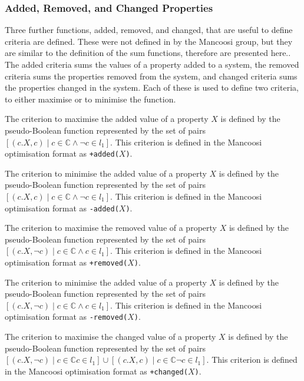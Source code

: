 \subsubsection{Added, Removed, and Changed Properties}
Three further functions, added, removed, and changed, that are useful to define criteria are defined.
These were not defined in by the Mancoosi group, but they are similar to the definition of the sum functions, therefore are presented here..
The added criteria sums the values of a property added to a system, 
the removed criteria sums the properties removed from the system,
 and changed criteria sums the properties changed in the system. 
Each of these is used to define two criteria, to either maximise or to minimise the function.

\begin{defs}
The criterion to maximise the added value of a property $X$ is defined by the pseudo-Boolean function 
represented by the set of pairs $[(c.X, c) \mid c \in \mathbb{C} \wedge \neg c \in l_1]$.
This criterion is defined in the Mancoosi optimisation format as \verb!+added(!$X$\verb+)+.
\end{defs}

\begin{defs}
The criterion to minimise the added value of a property $X$ is defined by the pseudo-Boolean function 
represented by the set of pairs $[(c.X, c) \mid c \in \mathbb{C} \wedge \neg c \in l_1]$.
This criterion is defined in the Mancoosi optimisation format as \verb!-added(!$X$\verb+)+.
\end{defs}

\begin{defs}
The criterion to maximise the removed value of a property $X$ is defined by the pseudo-Boolean function 
represented by the set of pairs $[(c.X, \neg c) \mid c \in \mathbb{C} \wedge  c \in l_1]$.
This criterion is defined in the Mancoosi optimisation format as \verb!+removed(!$X$\verb+)+.
\end{defs}

\begin{defs}
The criterion to minimise the added value of a property $X$ is defined by the pseudo-Boolean function 
represented by the set of pairs $[(c.X, \neg c) \mid c \in \mathbb{C} \wedge c \in l_1]$.
This criterion is defined in the Mancoosi optimisation format as \verb!-removed(!$X$\verb+)+.
\end{defs}

\begin{defs}
The criterion to maximise the changed value of a property $X$ is defined by the pseudo-Boolean function 
represented by the set of pairs $[(c.X,\neg c) \mid c \in \mathbb{C} c \in l_1] \cup [(c.X,c) \mid c \in \mathbb{C} \neg c \in l_1]$.
This criterion is defined in the Mancoosi optimisation format as \verb!+changed(!$X$\verb+)+.
\end{defs}

